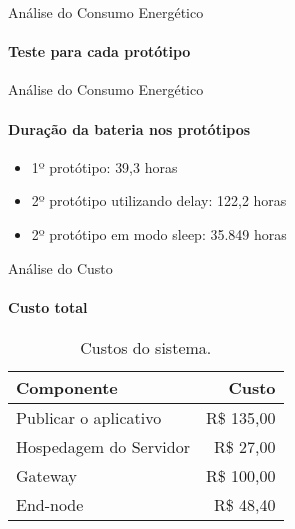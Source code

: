 \begin{frame}{Análise do Consumo Energético}
  \framesubtitle{Teste para cada protótipo}
\end{frame}

\begin{frame}{Análise do Consumo Energético}
  \framesubtitle{Duração da bateria nos protótipos}
  \begin{itemize}
    \item 1º protótipo: \alert{39,3 horas}
    \item 2º protótipo utilizando delay: \alert{122,2 horas}
    \item 2º protótipo em modo sleep: \alert{35.849 horas}
  \end{itemize}
\end{frame}

\begin{frame}{Análise do Custo}
  \framesubtitle{Custo total}
  \begin{table}[!b]{
    \scalebox{0.9} {
      \carlitoTLF
      \begin{tabularx}{\textwidth}{Xr}
        \textbf{Componente} & \textbf{Custo} \\
        \toprule
        Publicar o aplicativo & R\$ 135,00 \\
        Hospedagem do Servidor & R\$ 27,00 \\
        Gateway & R\$ 100,00 \\
        End-node & R\$ 48,40 \\
        \bottomrule
      \end{tabularx}
    }
  }
    \caption{Custos do sistema.}
  \end{table}
\end{frame}